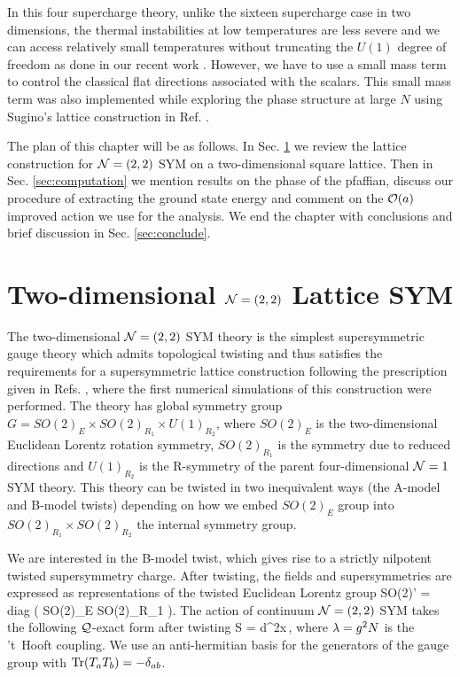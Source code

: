 In this four supercharge theory, unlike the sixteen supercharge case in two dimensions, the thermal instabilities at low temperatures are less severe and we can access relatively small temperatures without truncating the $U(1)$ degree of freedom as done in our recent work \cite{Catterall:2017lub, Jha:2017zad}. However, we have to use a small mass term to control the classical flat directions associated with the scalars. This small mass term was also implemented while exploring the phase structure at large $N$ using Sugino's lattice construction in Ref. \cite{Hanada:2009hq}. 

The plan of this chapter will be as follows. In Sec. \ref{sec:theory} we review the lattice construction for $\mathcal N = (2, 2)$ SYM on a two-dimensional square lattice. Then in Sec. \ref{sec:computation} we mention results on the phase of the pfaffian, discuss our procedure of extracting the ground state energy and comment on the $\mathcal O(a)$ improved action we use for the analysis. We end the chapter with conclusions and brief discussion in Sec. \ref{sec:conclude}.

\section{Two-dimensional $\mathcal N = (2, 2)$ Lattice SYM}
\label{sec:theory}

The two-dimensional $\mathcal N = (2, 2) $ SYM theory is the simplest supersymmetric gauge theory which admits topological twisting \cite{Witten:1988ze} and thus satisfies the requirements for a supersymmetric lattice construction following the prescription given in Refs. \cite{Catterall:2004np, Catterall:2006jw}, where the first numerical simulations of this construction were performed. The theory has global symmetry group $G = SO(2)_E \times SO(2)_{R_1} \times U(1)_{R_2}$, where $SO(2)_E$ is the two-dimensional Euclidean Lorentz rotation symmetry, $SO(2)_{R_1}$ is the symmetry due to reduced directions and $U(1)_{R_2}$ is the R-symmetry of the parent four-dimensional $\mathcal N =1$ SYM theory. This theory can be twisted in two inequivalent ways (the A-model and B-model twists) depending on how we embed $SO(2)_E$ group into $SO(2)_{R_1} \times SO(2)_{R_2}$ the internal symmetry group. 

We are interested in the B-model twist, which gives rise to a strictly nilpotent twisted supersymmetry charge. After twisting, the fields and supersymmetries are expressed as representations of the twisted Euclidean Lorentz group
\beq
SO(2)' = {\rm diag} \Big( SO(2)_E \times SO(2)_{R_1} \Big).
\eeq 
The action of continuum $\mathcal N = (2, 2)$ SYM takes the following $\mathcal Q$-exact form after twisting
\beq
S =  \cQ \int d^2x\,\Psi,
\label{2daction_twisted}
\eeq
where 
$\lambda = g^2 N$ is the 't~Hooft coupling. We use an anti-hermitian basis for the generators of the gauge group with $\mathrm{Tr} (T_a T_b)  = - \delta_{ab}$.

